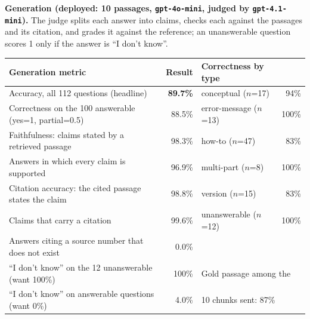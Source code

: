 \documentclass[10pt]{article}
\begin{document}
\begin{center}
\footnotesize
{}
\end{center}

\noindent\textbf{Generation (deployed: 10 passages, \texttt{gpt-4o-mini}, judged by \texttt{gpt-4.1-mini}).} The judge splits
each answer into claims, checks each against the passages and its citation, and grades it against the reference; an
unanswerable question scores 1 only if the answer is ``I don't know''.

\begin{center}
\footnotesize
\begin{tabular}{@{}p{8.5cm}r@{\hskip 1.0cm}p{4.2cm}r@{}}
\toprule
\textbf{Generation metric} & \textbf{Result} & \textbf{Correctness by type} & \textbf{} \\
\midrule
Accuracy, all 112 questions (headline) & \textbf{89.7\%} & conceptual ($n$=17) & 94\% \\
Correctness on the 100 answerable (yes=1, partial=0.5) & 88.5\% & error-message ($n$=13) & 100\% \\
Faithfulness: claims stated by a retrieved passage & 98.3\% & how-to ($n$=47) & 83\% \\
Answers in which every claim is supported & 96.9\% & multi-part ($n$=8) & 100\% \\
Citation accuracy: the cited passage states the claim & 98.8\% & version ($n$=15) & 83\% \\
Claims that carry a citation & 99.6\% & unanswerable ($n$=12) & 100\% \\
Answers citing a source number that does not exist & 0.0\% & & \\
``I don't know'' on the 12 unanswerable (want 100\%) & 100\% & \multicolumn{2}{l}{\footnotesize Gold passage among the} \\
``I don't know'' on answerable questions (want 0\%) & 4.0\% & \multicolumn{2}{l}{\footnotesize 10 chunks sent: 87\%} \\
\bottomrule
\end{tabular}
\end{center}
\end{document}
